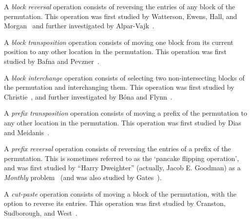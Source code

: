 \documentclass[12pt,twoside]{memoir}
\begin{document}
      \begin{definition}\label{polyclass:def:blockrev}
        A \emph{block reversal} operation consists of reversing the entries of
        any block of the permutation. This operation was first studied by
        Watterson, Ewens, Hall, and Morgan~\cite{Watterson1982} and further
        investigated by Alpar-Vajk~\cite{Alpar2009}.
      \end{definition}
      
      \begin{definition}\label{polyclass:def:blocktrans}
        A \emph{block transposition} operation consists of moving one block
        from its current position to any other location in the permutation. 
        This operation was first studied by Bafna and Pevzner~\cite{Bafna1998}. 
      \end{definition}
    
      \begin{definition}\label{polyclass:def:blockint}
        A \emph{block interchange} operation consists of selecting two
        non-intersecting blocks of the permutation and interchanging them. 
        This operation was first studied by Christie~\cite{Christie1996}, and
        further investigated by B\'ona and Flynn~\cite{Bona2009}. 
      \end{definition}
    
      \begin{definition}\label{polyclass:def:prefixtrans}
        A \emph{prefix transposition} operation consists of moving a prefix of
        the permutation to any other location in the permutation. 
        This operation was first studied by Dias and Meidanis~\cite{Dias2002}.
      \end{definition}
        
      \begin{definition}\label{polyclass:def:prefixrev}
        A \emph{prefix reversal} operation consists of reversing the entries of a
        prefix of the permutation. This is sometimes referred to as the `pancake
        flipping operation', and was first studied by ``Harry Dweighter''
        (actually, Jacob E. Goodman) as a \emph{Monthly}
        problem~\cite{Dweighter} (and was also studied by Gates~\cite{BillGates}). 
      \end{definition}
    
      \begin{definition}\label{polyclass:def:cutpaste}
        A \emph{cut-paste} operation consists of moving a block of the
        permutation, with the option to reverse its entries. 
        This operation was first studied by Cranston, Sudborough, and
        West~\cite{Cranston2007}. 
      \end{definition}
    
\end{document}
